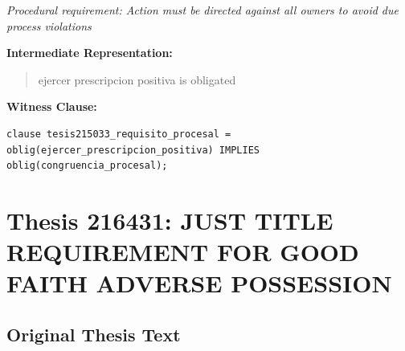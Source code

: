 \documentclass[11pt,a4paper]{article}
\begin{document}
\textit{Procedural requirement: Action must be directed against all owners to avoid due process violations}

\textbf{Intermediate Representation:}

\begin{quote}
ejercer prescripcion positiva is obligated
\end{quote}

\textbf{Witness Clause:}

\begin{lstlisting}[style=witnessstyle, language=Witness]
clause tesis215033_requisito_procesal = oblig(ejercer_prescripcion_positiva) IMPLIES oblig(congruencia_procesal);
\end{lstlisting}

\newpage

\section{Thesis 216431: JUST TITLE REQUIREMENT FOR GOOD FAITH ADVERSE POSSESSION}
\label{thesis:216431}

\subsection{Original Thesis Text}
\end{document}
